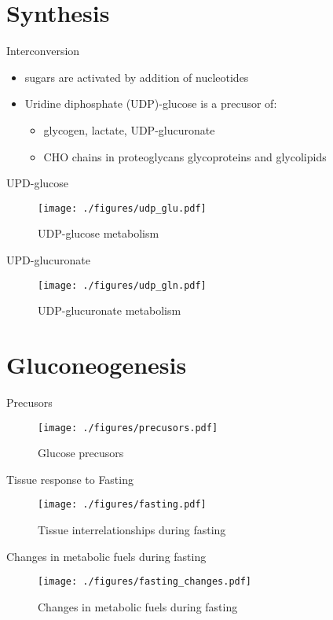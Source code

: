 \documentclass[presentation, smaller]{beamer}
\begin{document}
\section{Synthesis}
\label{sec:orgb0d0a33}
\begin{frame}[label={sec:org8e3f43a}]{Interconversion}
\begin{itemize}
\item sugars are activated by addition of nucleotides
\item Uridine diphosphate (UDP)-glucose is a precusor of:
\begin{itemize}
\item glycogen, lactate, UDP-glucuronate
\item CHO chains in proteoglycans glycoproteins and glycolipids
\end{itemize}
\end{itemize}
\end{frame}
\begin{frame}[label={sec:org99d8be0}]{UPD-glucose}
\begin{figure}[htbp]
\centering
\texttt{[image: ./figures/udp\_glu.pdf]}
\caption{\label{fig:org4f1daa5}
UDP-glucose metabolism}
\end{figure}
\end{frame}

\begin{frame}[label={sec:org3ded1fa}]{UPD-glucuronate}
\begin{figure}[htbp]
\centering
\texttt{[image: ./figures/udp\_gln.pdf]}
\caption{\label{fig:orgbb11eb5}
UDP-glucuronate metabolism}
\end{figure}
\end{frame}

\section{Gluconeogenesis}
\label{sec:org18760a0}

\begin{frame}[label={sec:org5e03c13}]{Precusors}
\begin{figure}[htbp]
\centering
\texttt{[image: ./figures/precusors.pdf]}
\caption{\label{fig:orged9d56b}
Glucose precusors}
\end{figure}
\end{frame}


\begin{frame}[label={sec:org201d6de}]{Tissue response to Fasting}
\begin{figure}[htbp]
\centering
\texttt{[image: ./figures/fasting.pdf]}
\caption{\label{fig:org51dfba9}
Tissue interrelationships during fasting}
\end{figure}
\end{frame}


\begin{frame}[label={sec:orga360087}]{Changes in metabolic fuels during fasting}
\begin{figure}[htbp]
\centering
\texttt{[image: ./figures/fasting\_changes.pdf]}
\caption{\label{fig:org0421c8f}
Changes in metabolic fuels during fasting}
\end{figure}
\end{frame}
\end{document}
